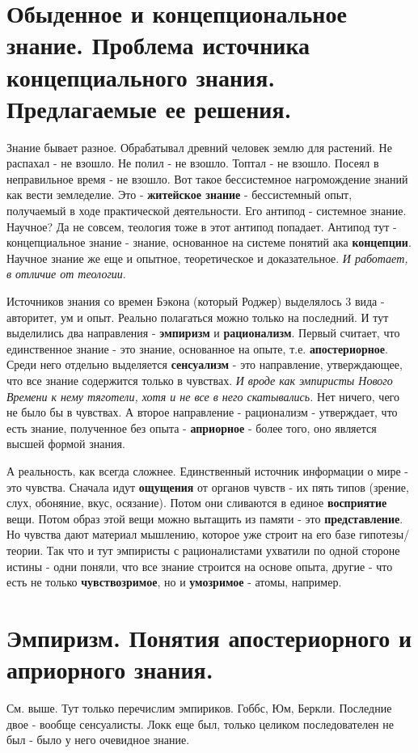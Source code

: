 \section{ Обыденное и концепциональное знание. Проблема источника концепциального знания. Предлагаемые ее решения.}
Знание бывает разное. Обрабатывал древний человек землю для растений. Не распахал - не взошло. Не полил - не взошло. Топтал - не взошло. Посеял в неправильное время - не взошло. Вот такое бессистемное нагромождение знаний как вести земледелие. Это - \textbf{житейское знание} - бессистемный опыт, получаемый в ходе практической деятельности. Его антипод - системное знание. Научное? Да не совсем, теология тоже в этот антипод попадает. Антипод тут - концепциальное знание - знание, основанное на системе понятий ака \textbf{концепции}. Научное знание же еще и опытное, теоретическое и доказательное. \textit{И работает, в отличие от теологии}.

Источников знания со времен Бэкона (который Роджер) выделялось 3 вида - авторитет, ум и опыт. Реально полагаться можно только на последний. И тут выделились два направления - \textbf{эмпиризм} и \textbf{рационализм}. Первый считает, что единственное знание - это знание, основанное на опыте, т.е. \textbf{апостериорное}. Среди него отдельно выделяется \textbf{сенсуализм} - это направление, утверждающее, что все знание содержится только в чувствах. \textit{И вроде как эмпиристы Нового Времени к нему тяготели, хотя и не все в него скатывались.} Нет ничего, чего не было бы в чувствах. А второе направление - рационализм - утверждает, что есть знание, полученное без опыта - \textbf{априорное} - более того, оно является высшей формой знания.

А реальность, как всегда сложнее. Единственный источник информации о мире - это чувства. Сначала идут \textbf{ощущения} от органов чувств - их пять типов (зрение, слух, обоняние, вкус, осязание). Потом они сливаются в единое \textbf{восприятие} вещи. Потом образ этой вещи можно вытащить из памяти - это \textbf{представление}. Но чувства дают материал мышлению, которое уже строит на его базе гипотезы/теории. Так что и тут эмпиристы с рационалистами ухватили по одной стороне истины - одни поняли, что все знание строится на основе опыта, другие - что есть не только \textbf{чувствозримое}, но и \textbf{умозримое} - атомы, например.

\section{ Эмпиризм. Понятия апостериорного и априорного знания.}
См. выше. Тут только перечислим эмпириков. Гоббс, Юм, Беркли. Последние двое - вообще сенсуалисты. Локк еще был, только целиком последователен не был - было у него очевидное знание.

